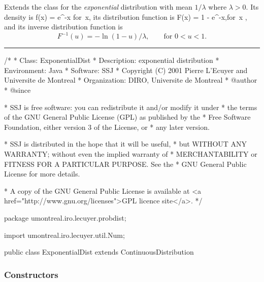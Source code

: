 
Extends the class  for
the {\em exponential\/} distribution \cite[page 494]{tJOH95a}
with mean $1/\lambda$ where $\lambda > 0$.
Its density is
\eq  f(x) = \lambda e^{-\lambda x}
     \qquad \mbox{for }x,          
\endeq
its distribution function is
\eq
   F(x) = 1 - e^{-\lambda x},\qquad \mbox{for }x ,
\endeq
and its inverse distribution function is
\[
  F^{-1}(u) = -\ln (1-u)/\lambda, \qquad  \mbox{for } 0 < u < 1.
\]

\bigskip\hrule

\begin{code}
\begin{hide}
/*
 * Class:        ExponentialDist
 * Description:  exponential distribution
 * Environment:  Java
 * Software:     SSJ 
 * Copyright (C) 2001  Pierre L'Ecuyer and Universite de Montreal
 * Organization: DIRO, Universite de Montreal
 * @author       
 * @since

 * SSJ is free software: you can redistribute it and/or modify it under
 * the terms of the GNU General Public License (GPL) as published by the
 * Free Software Foundation, either version 3 of the License, or
 * any later version.

 * SSJ is distributed in the hope that it will be useful,
 * but WITHOUT ANY WARRANTY; without even the implied warranty of
 * MERCHANTABILITY or FITNESS FOR A PARTICULAR PURPOSE.  See the
 * GNU General Public License for more details.

 * A copy of the GNU General Public License is available at
   <a href="http://www.gnu.org/licenses">GPL licence site</a>.
 */
\end{hide}
package umontreal.iro.lecuyer.probdist;
\begin{hide}
import  umontreal.iro.lecuyer.util.Num;\end{hide}

public class ExponentialDist extends ContinuousDistribution\begin{hide} {
   private double lambda;
\end{hide}
\end{code}
\subsubsection* {Constructors}

